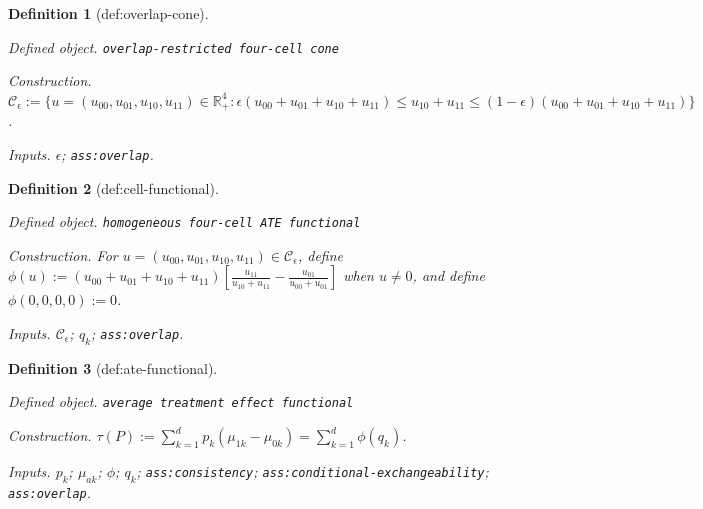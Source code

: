 \documentclass{article}
\newtheorem{definition}{Definition}
\begin{document}
\begin{definition}[def:overlap-cone]\label{def:overlap-cone}
\par\smallskip\noindent\emph{Defined object.} \texttt{overlap-restricted four-cell cone}
\par\smallskip\noindent\emph{Construction.} \(\mathcal C_\epsilon:=\{u=(u_{00},u_{01},u_{10},u_{11})\in\mathbb R_+^4: \epsilon(u_{00}+u_{01}+u_{10}+u_{11})\le u_{10}+u_{11}\le(1-\epsilon)(u_{00}+u_{01}+u_{10}+u_{11})\}\).
\par\smallskip\noindent\emph{Inputs.} \(\epsilon\); \texttt{ass:overlap}.
\end{definition}

\begin{definition}[def:cell-functional]\label{def:cell-functional}
\par\smallskip\noindent\emph{Defined object.} \texttt{homogeneous four-cell ATE functional}
\par\smallskip\noindent\emph{Construction.} For \(u=(u_{00},u_{01},u_{10},u_{11})\in\mathcal C_\epsilon\), define \(\phi(u):=(u_{00}+u_{01}+u_{10}+u_{11})\left[\frac{u_{11}}{u_{10}+u_{11}}-\frac{u_{01}}{u_{00}+u_{01}}\right]\) when \(u\neq0\), and define \(\phi(0,0,0,0):=0\).
\par\smallskip\noindent\emph{Inputs.} \(\mathcal C_\epsilon\); \(q_k\); \texttt{ass:overlap}.
\end{definition}

\begin{definition}[def:ate-functional]\label{def:ate-functional}
\par\smallskip\noindent\emph{Defined object.} \texttt{average treatment effect functional}
\par\smallskip\noindent\emph{Construction.} \(\tau(P):=\sum_{k=1}^{d}p_k(\mu_{1k}-\mu_{0k})=\sum_{k=1}^{d}\phi(q_k)\).
\par\smallskip\noindent\emph{Inputs.} \(p_k\); \(\mu_{ak}\); \(\phi\); \(q_k\); \texttt{ass:consistency}; \texttt{ass:conditional-exchangeability}; \texttt{ass:overlap}.
\end{definition}
\end{document}
